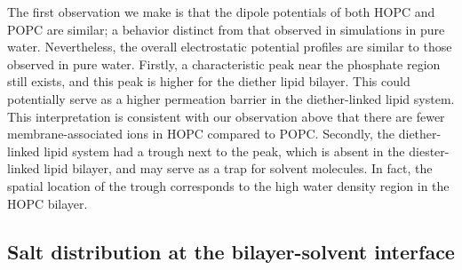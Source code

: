 \documentclass[12pt,openany,final]{book}
\begin{document}
The first observation we make is that the 
dipole potentials of both HOPC and POPC are similar; a behavior distinct from that 
observed in simulations in pure water. Nevertheless, the overall electrostatic potential 
profiles are similar to those observed in pure water. Firstly, a characteristic peak near the 
phosphate region still exists, and this peak is higher for the diether lipid bilayer. This could potentially 
serve as a higher permeation barrier in the diether-linked lipid system. This interpretation is consistent with our 
observation above that there are fewer membrane-associated ions in HOPC compared to POPC. Secondly, the 
diether-linked lipid system had a trough next to the peak, which is absent in the diester-linked lipid bilayer, and 
may serve as a trap for solvent molecules. In fact, the spatial location of the trough corresponds to the high water density region in the HOPC bilayer.



\subsection{Salt distribution at the bilayer-solvent interface}
\end{document}
